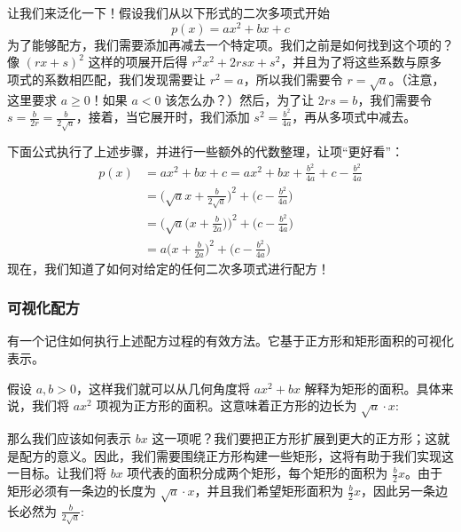 让我们来泛化一下！假设我们从以下形式的二次多项式开始
\[p(x) = ax^2 + bx + c\]
为了能够配方，我们需要添加再减去一个特定项。我们之前是如何找到这个项的？像 $(rx + s)^2$ 这样的项展开后得 $r^2x^2 + 2rsx + s^2$，并且为了将这些系数与原多项式的系数相匹配，我们发现需要让 $r^2 = a$，所以我们需要令 $r = \sqrt{a}$。（注意，这里要求 $a \ge 0$！如果 $a<0$ 该怎么办？）然后，为了让 $2rs = b$，我们需要令 $s = \frac{b}{2r} = \frac{b}{2\sqrt{a}}$，接着，当它展开时，我们添加 $s^2 = \frac{b^2}{4a}$，再从多项式中减去。

下面公式执行了上述步骤，并进行一些额外的代数整理，让项“更好看”：
\begin{align*}
    p(x) &= ax^2 + bx + c = ax^2 + bx + \frac{b^2}{4a} + c - \frac{b^2}{4a}\\
    &=\Big(\sqrt{a}x+\frac{b}{2\sqrt{a}}\Big)^2+\Big(c- \frac{b^2}{4a}\Big)\\
    &=\Big(\sqrt{a}\Big(x+\frac{b}{2a}\Big)\Big)^2+\Big(c- \frac{b^2}{4a}\Big)\\
    &=a\Big(x+\frac{b}{2a}\Big)^2+\Big(c- \frac{b^2}{4a}\Big)
\end{align*}
现在，我们知道了如何对给定的任何二次多项式进行配方！

\subsubsection*{可视化配方}

有一个记住如何执行上述配方过程的有效方法。它基于正方形和矩形面积的可视化表示。

假设 $a, b>0$，这样我们就可以从几何角度将 $ax^2+bx$ 解释为矩形的面积。具体来说，我们将 $ax^2$ 项视为正方形的面积。这意味着正方形的边长为 $\sqrt{a} \cdot x$: 

\begin{center}
\end{center}

那么我们应该如何表示 $bx$ 这一项呢？我们要把正方形扩展到更大的正方形；这就是配方的意义。因此，我们需要围绕正方形构建一些矩形，这将有助于我们实现这一目标。让我们将 $bx$ 项代表的面积分成两个矩形，每个矩形的面积为 $\frac{b}{2}x$。由于矩形必须有一条边的长度为 $\sqrt{a} \cdot x$，并且我们希望矩形面积为 $\frac{b}{2}x$，因此另一条边长必然为 $\frac{b}{2\sqrt{a}}$: 

